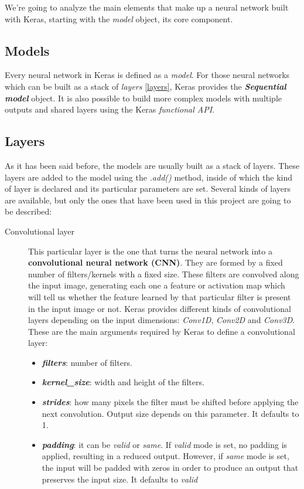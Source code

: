 We're going to analyze the main elements that make up a neural network built with Keras, starting with the \textit{model} object, its core component.

\subsection*{Models}\label{models}
Every neural network in Keras is defined as a \textit{model}. For those neural networks which can be built as a stack of \textit{layers} \ref{layers}, Keras provides the \textit{\textbf{Sequential model}} object. It is also possible to build more complex models with multiple outputs and shared layers using the Keras \textit{functional API}.

{\color{red}{SEQUENTIAL MODEL METHODS!!}}

\subsection*{Layers}\label{layers}
As it has been said before, the models are usually built as a stack of layers. These layers are added to the model using the \textit{.add()} method, inside of which the kind of layer is declared and its particular parameters are set. Several kinds of layers are available, but only the ones that have been used in this project are going to be described:
\begin{description}
	\item[Convolutional layer] This particular layer is the one that turns the neural network into a \textbf{convolutional neural network (CNN)}. They are formed by a fixed number of filters/kernels with a fixed size. These filters are convolved along the input image, generating each one a feature or activation map which will tell us whether the feature learned by that particular filter is present in the input image or not. Keras provides different kinds of convolutional layers depending on the input dimensions: \textit{Conv1D}, \textit{Conv2D} and \textit{Conv3D}. These are the main arguments required by Keras to define a convolutional layer:
	\begin{itemize}
		\item \textbf{\textit{filters}}: number of filters.
		\item \textbf{\textit{kernel\_size}}: width and height of the filters.
		\item \textbf{\textit{strides}}: how many pixels the filter must be shifted before applying the next convolution. Output size depends on this parameter. It defaults to 1.
		\item \textbf{\textit{padding}}: it can be \textit{valid} or \textit{same}. If \textit{valid} mode is set, no padding is applied, resulting in a reduced output. However, if \textit{same} mode is set, the input will be padded with zeros in order to produce an output that preserves the input size. It defaults to \textit{valid}
	\end{itemize}
\end{description}
